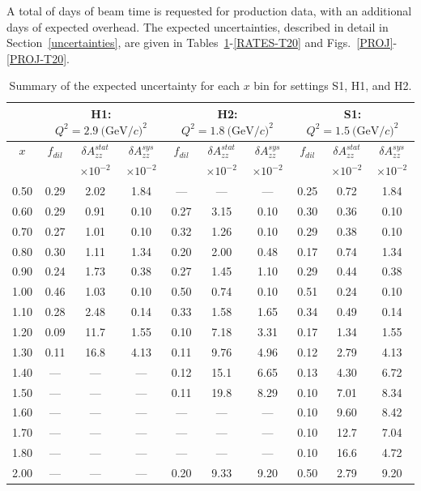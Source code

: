 A total of \productiondays days of beam time is requested for production data, with an additional \overheaddays days of expected overhead. The expected uncertainties, described in detail in Section~\ref{uncertainties}, are given in Tables~\ref{RATES2}-\ref{RATES-T20} and 
Figs.~\ref{PROJ}-\ref{PROJ-T20}.

\begin{table}
\begin{center}
\begin{tabular}{c|ccc|ccc|ccc}
 ~ & \multicolumn{3}{|c}{H1: $Q^2=2.9\mathrm{~(GeV/}c)^2$} & \multicolumn{3}{|c}{H2: $Q^2=1.8\mathrm{~(GeV/}c)^2$} & \multicolumn{3}{|c}{S1: $Q^2=1.5\mathrm{~(GeV/}c)^2$} \\
 \hline
  $x$  & $f_{dil}$ & $\delta A_{zz}^{stat}$ & $\delta A_{zz}^{sys}$ & $f_{dil}$ & $\delta A_{zz}^{stat}$ & $\delta A_{zz}^{sys}$ & $f_{dil}$ & $\delta A_{zz}^{stat}$ & $\delta A_{zz}^{sys}$ \\
  &     & $\times 10^{-2}$  & $\times 10^{-2}$  &    & $\times 10^{-2}$  & $\times 10^{-2}$ &    & $\times 10^{-2}$  & $\times 10^{-2}$ \\
\hline\hline
 0.50   &  0.29	 & 2.02	& 1.84	& ---	& ---	& ---	& 0.25	& 0.72	& 1.84 \\
 0.60   &  0.29	 & 0.91	& 0.10	& 0.27	& 3.15	& 0.10	& 0.30	& 0.36	& 0.10 \\ 
 0.70   &  0.27	 & 1.01	& 0.10	& 0.32	& 1.26	& 0.10	& 0.29	& 0.38	& 0.10 \\
 0.80	&  0.30	 & 1.11	& 1.34	& 0.20	& 2.00	& 0.48	& 0.17	& 0.74	& 1.34 \\
 0.90	&  0.24	 & 1.73 	& 0.38 	& 0.27	& 1.45	& 1.10	& 0.29	& 0.44	& 0.38 \\
 1.00	&  0.46	 & 1.03	& 0.10 	& 0.50	& 0.74	& 0.10	& 0.51	& 0.24	& 0.10 \\
 1.10	&  0.28	 & 2.48	& 0.14 	& 0.33	& 1.58	& 1.65	& 0.34	& 0.49	& 0.14 \\
 1.20	&  0.09	 & 11.7	& 1.55 	& 0.10	& 7.18	& 3.31	& 0.17	& 1.34	& 1.55 \\
 1.30	&  0.11	 & 16.8	& 4.13 	& 0.11	& 9.76	& 4.96	& 0.12	& 2.79	& 4.13 \\
 1.40	&  ---	 & ---	& --- 	& 0.12	& 15.1	& 6.65	& 0.13	& 4.30	& 6.72 \\
 1.50	&  ---	 & ---	& ---	& 0.11	& 19.8	& 8.29	& 0.10	& 7.01	& 8.34 \\
 1.60	&  ---	 & ---	& --- 	& ---	& ---	& ---	& 0.10	& 9.60	& 8.42 \\
 1.70	&  ---	 & ---	& --- 	& ---	& ---	& ---	& 0.10	& 12.7	& 7.04 \\
 1.80	&  ---	 & ---	& --- 	& ---	& ---	& ---	& 0.10	& 16.6	& 4.72 \\
 2.00   &  ---	 & ---	& ---	& 0.20	& 9.33	& 9.20	& 0.50	& 2.79	& 9.20 \\
\hline\hline
\end{tabular}
\caption{\label{RATES2}Summary of the expected uncertainty for each $x$ bin for settings S1, H1, and H2. }
\end{center}
\end{table}

